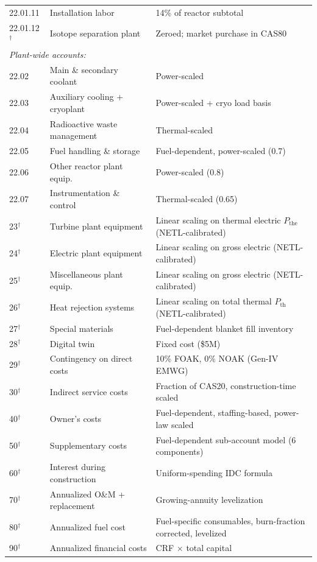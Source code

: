 \documentclass{article}
\begin{document}
\begin{table}[htbp]
\begin{tabular}{llp{7.0cm}}
\hspace{1em}22.01.11 & Installation labor & 14\% of reactor subtotal \\
\hspace{1em}22.01.12$^\dagger$ & Isotope separation plant & Zeroed; market purchase in CAS80 \\
\multicolumn{3}{l}{\textit{Plant-wide accounts:}} \\
\hspace{1em}22.02 & Main \& secondary coolant & Power-scaled \\
\hspace{1em}22.03 & Auxiliary cooling + cryoplant & Power-scaled + cryo load basis \\
\hspace{1em}22.04 & Radioactive waste management & Thermal-scaled \\
\hspace{1em}22.05 & Fuel handling \& storage & Fuel-dependent, power-scaled (0.7) \\
\hspace{1em}22.06 & Other reactor plant equip.\ & Power-scaled (0.8) \\
\hspace{1em}22.07 & Instrumentation \& control & Thermal-scaled (0.65) \\
23$^\dagger$ & Turbine plant equipment & Linear scaling on thermal electric $P_{\text{the}}$ (NETL-calibrated) \\
24$^\dagger$ & Electric plant equipment & Linear scaling on gross electric (NETL-calibrated) \\
25$^\dagger$ & Miscellaneous plant equip.\ & Linear scaling on gross electric (NETL-calibrated) \\
26$^\dagger$ & Heat rejection systems & Linear scaling on total thermal $P_{\text{th}}$ (NETL-calibrated) \\
27$^\dagger$ & Special materials & Fuel-dependent blanket fill inventory \\
28$^\dagger$ & Digital twin & Fixed cost (\$5M) \\
29$^\dagger$ & Contingency on direct costs & 10\% FOAK, 0\% NOAK (Gen-IV EMWG) \\
30$^\dagger$ & Indirect service costs & Fraction of CAS20, construction-time scaled \\
40$^\dagger$ & Owner's costs & Fuel-dependent, staffing-based, power-law scaled \\
50$^\dagger$ & Supplementary costs & Fuel-dependent sub-account model (6 components) \\
60$^\dagger$ & Interest during construction & Uniform-spending IDC formula \\
70$^\dagger$ & Annualized O\&M + replacement & Growing-annuity levelization \\
80$^\dagger$ & Annualized fuel cost & Fuel-specific consumables, burn-fraction corrected, levelized \\
90$^\dagger$ & Annualized financial costs & CRF $\times$ total capital \\
\bottomrule
\end{tabular}
\end{table}
\end{document}
